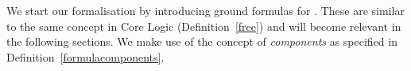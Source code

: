 % 
% 



We start our formalisation by introducing ground formulas for \nthree. These are similar to the same concept in \nthree 
Core Logic (Definition~\ref{free}) and will become relevant in the following sections. We make use of the concept of \emph{components} as specified in Definition~\ref{formulacomponents}.

